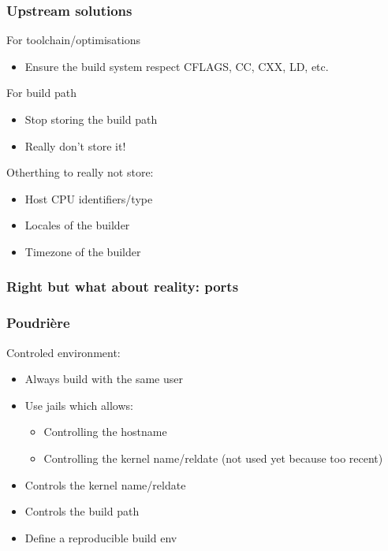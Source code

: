 \begin{frame}
	\frametitle{Upstream solutions}
	For toolchain/optimisations
	\begin{itemize}
		\item Ensure the build system respect CFLAGS, CC, CXX, LD, etc.
	\end{itemize}
	\pause
	For build path
	\begin{itemize}
		\item Stop storing the build path
			\pause
		\item Really don't store it!
	\end{itemize}
	\pause
	Otherthing to really not store:
	\begin{itemize}
		\item Host CPU identifiers/type
			\pause
		\item Locales of the builder
			\pause
		\item Timezone of the builder
	\end{itemize}
\end{frame}
\begin{frame}
	\frametitle{Right but what about reality: ports}
	\pause
\end{frame}

\begin{frame}
	\frametitle{Poudrière}
	Controled environment:
	\begin{itemize}
		\item Always build with the same user
			\pause
		\item Use jails which allows:
			\begin{itemize}
				\item Controlling the hostname
				\item Controlling the kernel name/reldate (not used yet because too recent)
			\end{itemize}
			\pause
		\item Controls the kernel name/reldate
			\pause
		\item Controls the build path
			\pause
		\item Define a reproducible build env
	\end{itemize}
\end{frame}

